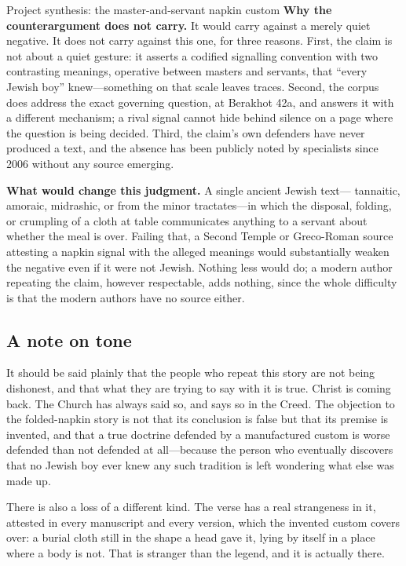 \begin{studybox}{Project synthesis: the master-and-servant napkin custom}
\textbf{Why the counterargument does not carry.} It would carry against a
merely quiet negative. It does not carry against this one, for three reasons.
First, the claim is not about a quiet gesture: it asserts a codified signalling
convention with two contrasting meanings, operative between masters and
servants, that ``every Jewish boy'' knew---something on that scale leaves
traces. Second, the corpus does address the exact governing question, at
Berakhot 42a, and answers it with a different mechanism; a rival signal cannot
hide behind silence on a page where the question is being decided. Third, the
claim's own defenders have never produced a text, and the absence has been
publicly noted by specialists since 2006 without any source emerging.

\textbf{What would change this judgment.} A single ancient Jewish text---
tannaitic, amoraic, midrashic, or from the minor tractates---in which the
disposal, folding, or crumpling of a cloth at table communicates anything to a
servant about whether the meal is over. Failing that, a Second Temple or
Greco-Roman source attesting a napkin signal with the alleged meanings would
substantially weaken the negative even if it were not Jewish. Nothing less
would do; a modern author repeating the claim, however respectable, adds
nothing, since the whole difficulty is that the modern authors have no source
either.
\end{studybox}

\subsection{A note on tone}

It should be said plainly that the people who repeat this story are not being
dishonest, and that what they are trying to say with it is true. Christ is
coming back. The Church has always said so, and says so in the Creed. The
objection to the folded-napkin story is not that its conclusion is false but
that its premise is invented, and that a true doctrine defended by a
manufactured custom is worse defended than not defended at all---because the
person who eventually discovers that no Jewish boy ever knew any such tradition
is left wondering what else was made up.

There is also a loss of a different kind. The verse has a real strangeness in
it, attested in every manuscript and every version, which the invented custom
covers over: a burial cloth still in the shape a head gave it, lying by itself
in a place where a body is not. That is stranger than the legend, and it is
actually there.
